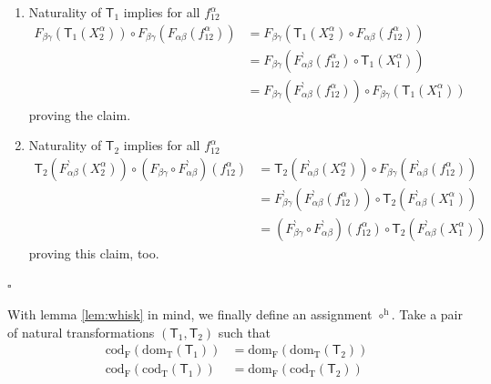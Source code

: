 \begin{prf}
\begin{enumerate}
\item[(a)]
Naturality of $\mathsf{T}_{1}$ implies for all $f_{12}^{\alpha}$
\begin{align*}
  F_{\beta\gamma}
  \left(
    \mathsf{T}_{1}(X_{2}^{\alpha})
  \right)
  \circ
  F_{\beta\gamma}
  \left(
    F_{\alpha\beta}(f_{12}^{\alpha})
  \right)
  &=
  F_{\beta\gamma}
  \left(
    \mathsf{T}_{1}(X_{2}^{\alpha})
    \circ
    F_{\alpha\beta}(f_{12}^{\alpha})
  \right)
  \\
  &=
  F_{\beta\gamma}
  \left(
    F_{\alpha\beta}^{\backprime}(f_{12}^{\alpha})
    \circ
    \mathsf{T}_{1}(X_{1}^{\alpha})
  \right)
  \\
  &=
  F_{\beta\gamma}
  \left(
    F_{\alpha\beta}^{\backprime}(f_{12}^{\alpha})
  \right)
  \circ
  F_{\beta\gamma}
  \left(
    \mathsf{T}_{1}(X_{1}^{\alpha})
  \right)
\end{align*}
proving the claim.
\item[(b)]
Naturality of $\mathsf{T}_{2}$ implies for all $f_{12}^{\alpha}$
\begin{align*}
  \mathsf{T}_{2}
  \left(
    F_{\alpha\beta}^{\backprime}(X_{2}^{\alpha})
  \right)
  \circ
  \left(
    F_{\beta\gamma}
    \circ
    F_{\alpha\beta}^{\backprime}
  \right)
  (f_{12}^{\alpha})
  &=
  \mathsf{T}_{2}
  \left(
    F_{\alpha\beta}^{\backprime}(X_{2}^{\alpha})
  \right)
  \circ
  F_{\beta\gamma}
  \left(
    F_{\alpha\beta}^{\backprime}(f_{12}^{\alpha})
  \right)
  \\
  &=
  F_{\beta\gamma}^{\backprime}
  \left(
    F_{\alpha\beta}^{\backprime}(f_{12}^{\alpha})
  \right)
  \circ
  \mathsf{T}_{2}
  \left(
    F_{\alpha\beta}^{\backprime}(X_{1}^{\alpha})
  \right)
  \\
  &=
  \left(
    F_{\beta\gamma}^{\backprime}
    \circ
    F_{\alpha\beta}^{\backprime}
  \right)
  (f_{12}^{\alpha})
  \circ
  \mathsf{T}_{2}
  \left(
    F_{\alpha\beta}^{\backprime}(X_{1}^{\alpha})
  \right)
\end{align*}
proving this claim, too.
\end{enumerate}
\phantom{proven}
\hfill
$\square$
\end{prf}
With lemma \ref{lem:whisk} in mind, we finally define an assignment $\circ^{\textrm{h}}$.
Take a pair of natural transformations $(\mathsf{T}_{1},\mathsf{T}_{2})$ such that
\begin{align*}
  \mathrm{cod_{F}}
  \left(
    \mathrm{dom_{T}}(\mathsf{T}_{1})
  \right)
  &=
  \mathrm{dom_{F}}
  \left(
    \mathrm{dom_{T}}(\mathsf{T}_{2})
  \right)
  \\
  \mathrm{cod_{F}}
  \left(
    \mathrm{cod_{T}}(\mathsf{T}_{1})
  \right)
  &=
  \mathrm{dom_{F}}
  \left(
    \mathrm{cod_{T}}(\mathsf{T}_{2})
  \right)
\end{align*}
